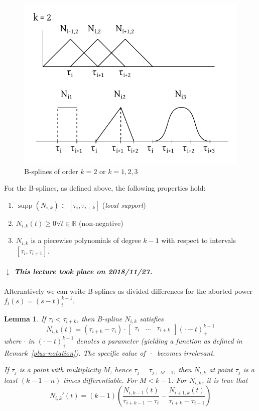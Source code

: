 \documentclass[a4paper]{article}
\newcounter{lecref}[section]
\numberwithin{lecref}{section}
\theoremstyle{break}
\newtheorem{lemma}[lecref]{Lemma}
\newcommand{\dateref}[1]{%
  \begin{mdframed}[backgroundcolor=gray!10,innerbottommargin=0pt,innertopmargin=0pt]
    \paragraph{\textit{$\downarrow$ This lecture took place on #1.}}%
  \end{mdframed}%
}
\begin{document}
\begin{figure}[!ht]
  \begin{center}
    \includegraphics{img/bsplines.pdf}
    \caption{B-splines of order $k = 2$ or $k = 1, 2, 3$}
  \end{center}
\end{figure}

For the B-splines, as defined above, the following properties hold:
\begin{enumerate}
  \item $\operatorname{supp}(N_{i,k}) \subset [\tau_i, \tau_{i+k}]$ (\emph{local support})
  \item $N_{i,k}(t) \geq 0 \forall t \in \mathbb R$ (non-negative)
  \item $N_{i,k}$ is a piecewise polynomials of degree $k-1$ with respect to intervals $[\tau_i, \tau_{i+1}]$.
\end{enumerate}

\dateref{2018/11/27}

Alternatively we can write B-splines as divided differences for the aborted power $f_t(s) = (s - t)_t^{k-1}$.

\begin{lemma}
  \label{lemma:b-spline}
  If $\tau_i < \tau_{i+k}$, then B-spline $N_{i,k}$ satisfies
  \[ N_{i,k}(t) = (\tau_{i+k} - \tau_i) \cdot \begin{bmatrix} \tau_i & \dots & \tau_{i+k} \end{bmatrix} (\cdot -t)_{+}^{k-1} \]
  where $\cdot$ in $(\cdot -t)_{+}^{k-1}$ denotes a parameter (yielding a function as defined in Remark~\ref{plus-notation}). The specific value of $\,\cdot$\, becomes irrelevant.

  If $\tau_j$ is a point with multiplicity $M$, hence $\tau_j = \tau_{j+M-1}$, then $N_{i,k}$ at point $\tau_j$ is a least $(k-1-n)$ times differentiable. For $M < k-1$. For $N_{i,k}$, it is true that
  \[ N_{i,k}'(t) = (k-1)\left(\frac{N_{i,k-1}(t)}{\tau_{i+k-1} - \tau_i} - \frac{N_{i+1,k}(t)}{\tau_{i+k} - \tau_{i+1}}\right) \]
\end{lemma}
\end{document}
